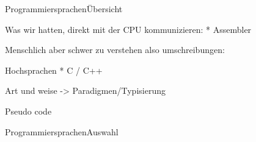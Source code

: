 




	

	
\begin{frame}{Programmiersprachen}{Übersicht}

	Was wir hatten, direkt mit der CPU kommunizieren:
		* Assembler
		
	Menschlich aber schwer zu verstehen also umschreibungen:
	
	Hochsprachen
		* C / C++	
		
	Art und weise -> Paradigmen/Typisierung
	
	Pseudo code
	
	
\end{frame}


\begin{frame}{Programmiersprachen}{Auswahl}
		
	
\end{frame}